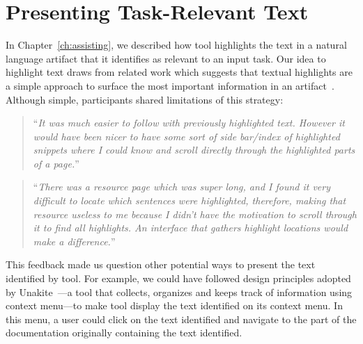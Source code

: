 




\section{Presenting Task-Relevant Text}
\label{cp7:info-viz}




In Chapter~\ref{ch:assisting}, we described how \acs{tool}
highlights the text in a natural language artifact that it identifies 
as relevant to an input task. Our idea to highlight text 
draws from related work which suggests that textual highlights 
are a simple approach to surface the most important information in 
an artifact~\cite{Robillard2015,nadi2020}. 
Although simple, participants shared limitations of 
this strategy:



\smallskip
\begin{footnotesize}
\begin{quote}
``\textit{It was much easier to follow with previously highlighted text.  
    However it would have been nicer to have some sort of side bar/index of highlighted snippets
    where I could know and scroll directly through the highlighted parts of a page.}''
\end{quote}
\end{footnotesize}



\smallskip
\begin{footnotesize}
\begin{quote}
``\textit{There was a resource page which was super long, and I found it very difficult to locate which sentences were highlighted, therefore, making that resource useless to me because I didn't have the motivation to scroll through it to find all highlights. An interface that gathers highlight locations would make a difference.}''
\end{quote}
\end{footnotesize}





 


\smallskip
This feedback made us question other potential ways to present the text identified by \acs{tool}.
For example, we could have followed design principles adopted by Unakite~\cite{Liu2018Unakite}---a tool that collects, organizes and keeps track of information using context menu---to make \acs{tool} display the text identified on its context menu.
In this menu, a user could click on the text identified and navigate to the part of the documentation 
originally containing the text identified.



